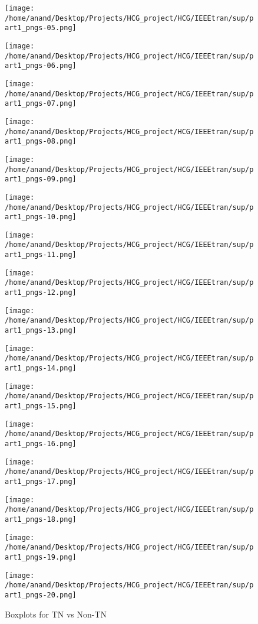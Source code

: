 \documentclass[10pt,final,1p,times,twocolumn]{elsarticle}
\begin{document}
\begin{figure*}
\begin{multicols}{2}
    \texttt{[image: /home/anand/Desktop/Projects/HCG\_project/HCG/IEEEtran/sup/part1\_pngs-05.png]}\par 
    \texttt{[image: /home/anand/Desktop/Projects/HCG\_project/HCG/IEEEtran/sup/part1\_pngs-06.png]}\par 
    \texttt{[image: /home/anand/Desktop/Projects/HCG\_project/HCG/IEEEtran/sup/part1\_pngs-07.png]}\par 
    \texttt{[image: /home/anand/Desktop/Projects/HCG\_project/HCG/IEEEtran/sup/part1\_pngs-08.png]}\par 
    \end{multicols}
\begin{multicols}{2}
    \texttt{[image: /home/anand/Desktop/Projects/HCG\_project/HCG/IEEEtran/sup/part1\_pngs-09.png]}\par 
    \texttt{[image: /home/anand/Desktop/Projects/HCG\_project/HCG/IEEEtran/sup/part1\_pngs-10.png]}\par 
    \texttt{[image: /home/anand/Desktop/Projects/HCG\_project/HCG/IEEEtran/sup/part1\_pngs-11.png]}\par 
    \texttt{[image: /home/anand/Desktop/Projects/HCG\_project/HCG/IEEEtran/sup/part1\_pngs-12.png]}\par 
\end{multicols}
\end{figure*}

\begin{figure*}
\begin{multicols}{2}
    \texttt{[image: /home/anand/Desktop/Projects/HCG\_project/HCG/IEEEtran/sup/part1\_pngs-13.png]}\par 
    \texttt{[image: /home/anand/Desktop/Projects/HCG\_project/HCG/IEEEtran/sup/part1\_pngs-14.png]}\par 
    \texttt{[image: /home/anand/Desktop/Projects/HCG\_project/HCG/IEEEtran/sup/part1\_pngs-15.png]}\par 
    \texttt{[image: /home/anand/Desktop/Projects/HCG\_project/HCG/IEEEtran/sup/part1\_pngs-16.png]}\par 
    \end{multicols}
\begin{multicols}{2}
    \texttt{[image: /home/anand/Desktop/Projects/HCG\_project/HCG/IEEEtran/sup/part1\_pngs-17.png]}\par 
    \texttt{[image: /home/anand/Desktop/Projects/HCG\_project/HCG/IEEEtran/sup/part1\_pngs-18.png]}\par 
    \texttt{[image: /home/anand/Desktop/Projects/HCG\_project/HCG/IEEEtran/sup/part1\_pngs-19.png]}\par 
    \texttt{[image: /home/anand/Desktop/Projects/HCG\_project/HCG/IEEEtran/sup/part1\_pngs-20.png]}\par 
\end{multicols}
\caption{Boxplots for TN vs Non-TN}
\label{f1}
\end{figure*}
\end{document}
